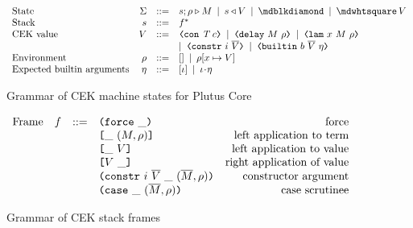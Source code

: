 \begin{figure}[H]
    \centering
    \[\begin{array}{lrclr}
    \textrm{State} & \Sigma & ::= & s;\rho \compute M \enspace | \enspace s \return V  \enspace |
       \enspace \cekerror{} \enspace | \enspace \cekhalt{V}\\
    \textrm{Stack} & s      & ::= & f^*\\
    \textrm{CEK value} & V &  ::= & \VCon{\tn}{c} \enspace | \enspace \VDelay{M}{\rho}
       \enspace| \enspace \VLamAbs{x}{M}{\rho} \enspace \\
       &&& | \enspace \VConstr{i}{\repetition{V}} \enspace | \enspace \VBuiltin{b}{\repetition{V}}{\eta}\\
    \textrm{Environment} & \rho & ::= & [] \enspace | \enspace \rho[x \mapsto V] \\
    \textrm{Expected builtin arguments} & \eta & ::= & [\iota] \enspace | \enspace \iota \cons \eta\\
    \end{array}\] 
    \caption{Grammar of CEK machine states for Plutus Core}
    \label{fig:untyped-cek-states}
\end{figure}%
%
%
%
%
%

\begin{figure}[H]
    \centering
    \[\begin{array}{lrclr}
        \textrm{Frame} & f  & ::=   & \texttt{(} \texttt{force} ~ \_ \texttt{)}                                                       & \textrm{force}\\
                       &    &       & \texttt{[} \_ ~ (M,\rho) \texttt{]}                                           & \textrm{left application to term}\\
                       &    &       & \texttt{[} \_ ~ V \texttt{]}                                                  & \textrm{left application to value}\\
                       &    &       & \texttt{[} V ~ \_ \texttt{]}                                                 & \textrm{right application of value}\\
                       &    &       & \texttt{(} \texttt{constr} ~ i ~ \overline{V} ~ \_ ~ (\overline{M}, \rho) \texttt{)}           & \textrm{constructor argument}\\
                       &    &       & \texttt{(} \texttt{case} ~ \_ ~ (\overline{M}, \rho) \texttt{)}                                & \textrm{case scrutinee}

    \end{array}\]
    \caption{Grammar of CEK stack frames}
    \label{fig:untyped-cek-reduction-frames}
\end{figure}%

